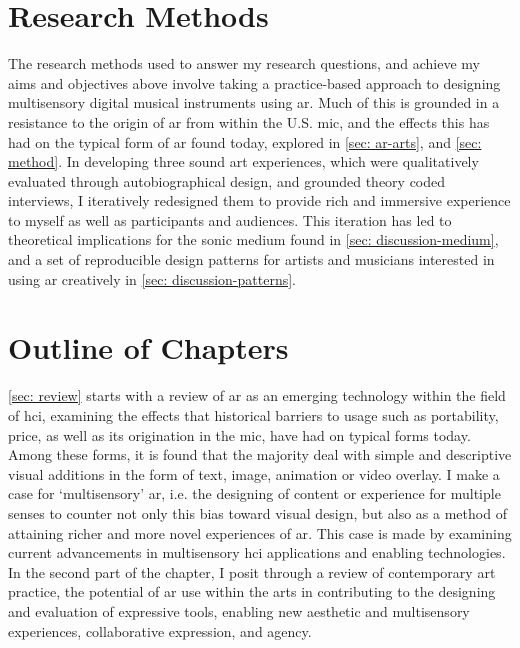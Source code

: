 \section{Research Methods}\label{sec: introduction-methods}
The research methods used to answer my research questions, and achieve my aims and objectives above involve taking a practice-based approach to designing multisensory digital musical instruments using \gls{ar}. Much of this is grounded in a resistance to the origin of \gls{ar} from within the U.S. \gls{mic}, and the effects this has had on the typical form of \gls{ar} found today, explored in \autoref{sec: ar-arts}, and \autoref{sec: method}. In developing three sound \gls{art} experiences, which were qualitatively evaluated through autobiographical design, and grounded theory coded interviews, I iteratively redesigned them to provide rich and immersive experience to myself as well as participants and audiences. This iteration has led to theoretical implications for the sonic medium found in \autoref{sec: discussion-medium}, and a set of reproducible design patterns for artists and musicians interested in using \gls{ar} creatively in \autoref{sec: discussion-patterns}.




\section{Outline of Chapters}\label{sec: introduction-outline}
\autoref{sec: review} starts with a review of \gls{ar} as an emerging technology within the field of \gls{hci}, examining the effects that historical barriers to usage such as portability, price, as well as its origination in the \gls{mic}, have had on typical forms today. Among these forms, it is found that the majority deal with simple and descriptive visual additions in the form of text, image, animation or video overlay. I make a case for `multisensory' \gls{ar}, i.e. the designing of content or experience for multiple senses to counter not only this bias toward visual design, but also as a method of attaining richer and more novel experiences of \gls{ar}. This case is made by examining current advancements in multisensory \gls{hci} applications and enabling technologies. In the second part of the chapter, I posit through a review of contemporary art practice, the potential of \gls{ar} use within the arts in contributing to the designing and evaluation of expressive tools, enabling new aesthetic and multisensory experiences, collaborative expression, and agency.

